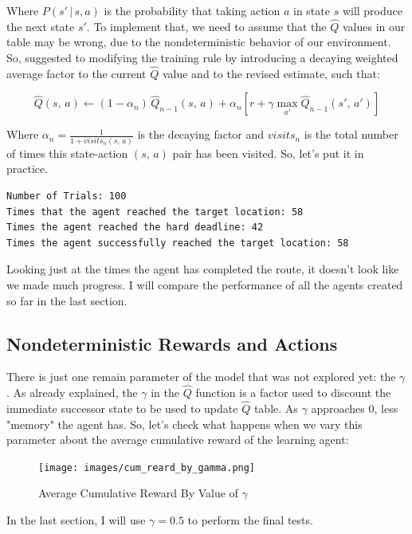 \documentclass[a4paper]{article}
\begin{document}
Where $P\left(s' \,| \,s, a   \right)$ is the probability that taking action $a$ in state $s$ will produce the next state $s'$. To implement that, we need to assume that the $\hat{Q}$ values in our table may be wrong, due to the nondeterministic behavior of our environment. So, \cite{Mitchell} suggested to modifying the training rule by introducing a decaying weighted average factor to the current $\hat{Q}$ value and to the revised estimate, such that:

$$\hat{Q}(s, \, a) \leftarrow  (1 - \alpha_{n})\, \hat{Q}_{n-1}(s, \, a) +  \alpha_{n}\left[ r + \gamma \underset{a'}{\max} \hat{Q}_{n-1}(s', \, a') \right ]$$

Where $\alpha_{n} = \frac{1}{1 + visits_{n}(s, \,a)}$ is the decaying factor and $visits_{n}$ is the total number of times this state-action $(s, \, a)$ pair has been visited. So, let's put it in practice.

\begin{lstlisting}
Number of Trials: 100
Times that the agent reached the target location: 58
Times the agent reached the hard deadline: 42
Times the agent successfully reached the target location: 58
\end{lstlisting}

Looking just at the times the agent has completed the route, it doesn't look like we made much progress. I will compare the performance of all the agents created so far in the last section.

\subsection{Nondeterministic Rewards and Actions}
There is just one remain parameter of the model that was not explored yet:  the $\gamma$. As already explained, the $\gamma$ in the $\hat{Q}$ function is a factor used to discount the immediate successor state to be used to update $\hat{Q}$ table. As $\gamma$ approaches $0$, less "memory" the agent has. So, let's check what happens when we vary this parameter about the average cumulative reward of the learning agent:

\begin{figure}[ht!]
\centering
\texttt{[image: images/cum\_reard\_by\_gamma.png]}
\caption{\label{fig:avg_cum_rwd}Average Cumulative Reward By Value of $\gamma$}
\end{figure}

In the last section, I will use $\gamma = 0.5$ to perform the final tests.
\end{document}

